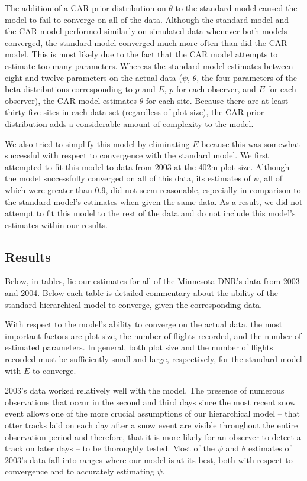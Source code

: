\documentclass[12pt]{article}
\begin{document}
    The addition of a CAR prior distribution on \(\theta\) to the standard model
    caused the model to fail to converge on all of the data. Although the
    standard model and the CAR model performed similarly on simulated data
    whenever both models converged, the standard model converged much more often
    than did the CAR model. This is most likely due to the fact that the CAR
    model attempts to estimate too many parameters. Whereas the standard model
    estimates between eight and twelve parameters on the actual data (\(\psi\),
    \(\theta\), the four parameters of the beta distributions corresponding to
    \(p\) and \(E\), \(p\) for each observer, and \(E\) for each observer), the
    CAR model estimates \(\theta\) for each site. Because there are at least
    thirty-five sites in each data set (regardless of plot size), the CAR prior
    distribution adds a considerable amount of complexity to the model.

    We also tried to simplify this model by eliminating \(E\) because this was
    somewhat successful with respect to convergence with the standard model. We
    first attempted to fit this model to data from 2003 at the 402m plot size.
    Although the model successfully converged on all of this data, its estimates
    of \(\psi\), all of which were greater than 0.9, did not seem reasonable,
    especially in comparison to the standard model's estimates when given the
    same data. As a result, we did not attempt to fit this model to the rest of
    the data and do not include this model's estimates within our results.

    \subsection{Results}
    Below, in tables, lie our estimates for all of the Minnesota DNR's data from
    2003 and 2004. Below each table is detailed commentary about the ability of
    the standard hierarchical model to converge, given the corresponding data.

    With respect to the model's ability to converge on the actual data, the most
    important factors are plot size, the number of flights recorded, and the
    number of estimated parameters. In general, both plot size and the number of
    flights recorded must be sufficiently small and large, respectively, for the
    standard model with \(E\) to converge.

    2003's data worked relatively well with the model. The presence of numerous
    observations that occur in the second and third days since the most recent
    snow event allows one of the more crucial assumptions of our hierarchical
    model -- that otter tracks laid on each day after a snow event are visible
    throughout the entire observation period and therefore, that it is more
    likely for an observer to detect a track on later days -- to be thoroughly
    tested. Most of the \(\psi\) and \(\theta\) estimates of 2003's data fall
    into ranges where our model is at its best, both with respect to convergence
    and to accurately estimating \(\psi\).
\end{document}
